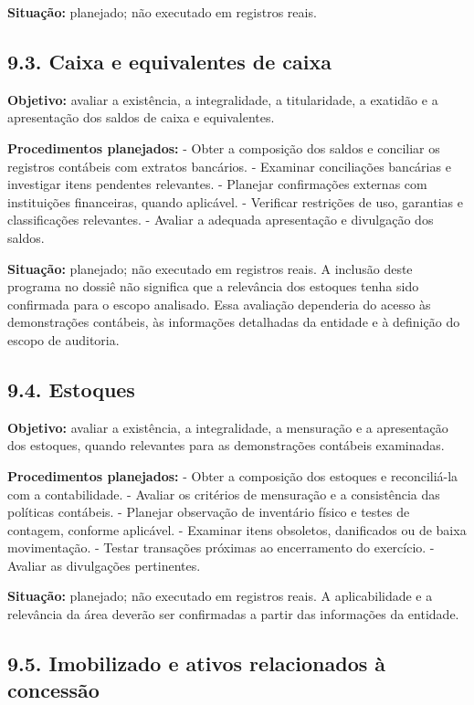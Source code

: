 \documentclass[
]{article}
\begin{document}
\textbf{Situação:} planejado; não executado em registros reais.

\subsection{9.3. Caixa e equivalentes de
caixa}\label{caixa-e-equivalentes-de-caixa}

\textbf{Objetivo:} avaliar a existência, a integralidade, a
titularidade, a exatidão e a apresentação dos saldos de caixa e
equivalentes.

\textbf{Procedimentos planejados:} - Obter a composição dos saldos e
conciliar os registros contábeis com extratos bancários. - Examinar
conciliações bancárias e investigar itens pendentes relevantes. -
Planejar confirmações externas com instituições financeiras, quando
aplicável. - Verificar restrições de uso, garantias e classificações
relevantes. - Avaliar a adequada apresentação e divulgação dos saldos.

\textbf{Situação:} planejado; não executado em registros reais. A
inclusão deste programa no dossiê não significa que a relevância dos
estoques tenha sido confirmada para o escopo analisado. Essa avaliação
dependeria do acesso às demonstrações contábeis, às informações
detalhadas da entidade e à definição do escopo de auditoria.

\subsection{9.4. Estoques}\label{estoques}

\textbf{Objetivo:} avaliar a existência, a integralidade, a mensuração e
a apresentação dos estoques, quando relevantes para as demonstrações
contábeis examinadas.

\textbf{Procedimentos planejados:} - Obter a composição dos estoques e
reconciliá-la com a contabilidade. - Avaliar os critérios de mensuração
e a consistência das políticas contábeis. - Planejar observação de
inventário físico e testes de contagem, conforme aplicável. - Examinar
itens obsoletos, danificados ou de baixa movimentação. - Testar
transações próximas ao encerramento do exercício. - Avaliar as
divulgações pertinentes.

\textbf{Situação:} planejado; não executado em registros reais. A
aplicabilidade e a relevância da área deverão ser confirmadas a partir
das informações da entidade.

\subsection{9.5. Imobilizado e ativos relacionados à
concessão}\label{imobilizado-e-ativos-relacionados-uxe0-concessuxe3o}
\end{document}
